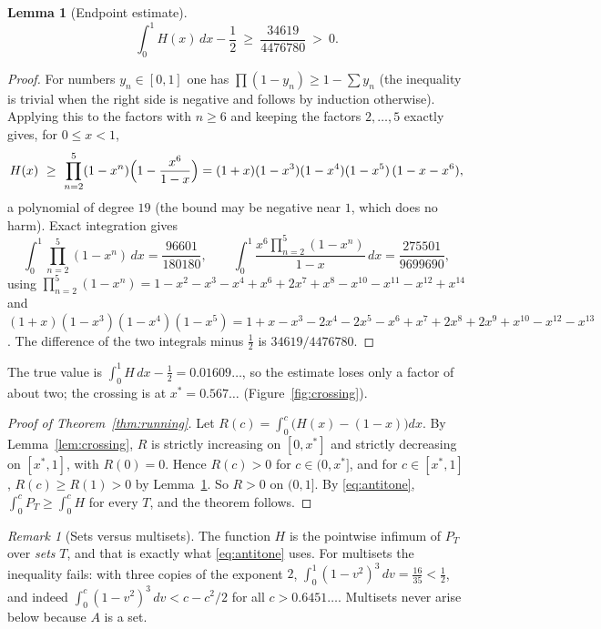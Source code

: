 \documentclass[11pt]{article}
\newtheorem{lemma}[theorem]{Lemma}
\theoremstyle{remark}
\newtheorem{remark}[theorem]{Remark}
\begin{document}
\begin{lemma}[Endpoint estimate]\label{lem:endpoint}
\[
  \int_0^1H(x)\,dx-\frac12\ \ge\ \frac{34619}{4476780}\ >\ 0 .
\]
\end{lemma}

\begin{proof}
For numbers $y_n\in[0,1]$ one has $\prod(1-y_n)\ge1-\sum y_n$ (the
inequality is trivial when the right side is negative and follows by
induction otherwise). Applying this to the factors with $n\ge6$ and
keeping the factors $2,\dots,5$ exactly gives, for $0\le x<1$,
\[
  H(x)\ \ge\ \prod_{n=2}^{5}(1-x^n)\Bigl(1-\frac{x^6}{1-x}\Bigr)
  =(1+x)(1-x^3)(1-x^4)(1-x^5)\,(1-x-x^6),
\]
a polynomial of degree $19$ (the bound may be negative near $1$, which
does no harm). Exact integration gives
\[
  \int_0^1\prod_{n=2}^{5}(1-x^n)\,dx=\frac{96601}{180180},
  \qquad
  \int_0^1\frac{x^6\prod_{n=2}^{5}(1-x^n)}{1-x}\,dx=\frac{275501}{9699690},
\]
using $\prod_{n=2}^{5}(1-x^n)
=1-x^2-x^3-x^4+x^6+2x^7+x^8-x^{10}-x^{11}-x^{12}+x^{14}$ and
$(1+x)(1-x^3)(1-x^4)(1-x^5)
=1+x-x^3-2x^4-2x^5-x^6+x^7+2x^8+2x^9+x^{10}-x^{12}-x^{13}$.
The difference of the two integrals minus $\tfrac12$ is
$34619/4476780$.
\end{proof}

The true value is $\int_0^1H\,dx-\tfrac12=0.01609\ldots$, so the
estimate loses only a factor of about two; the crossing is at
$x^*=0.567\ldots$ (Figure~\ref{fig:crossing}).

\begin{proof}[Proof of Theorem~\ref{thm:running}]
Let $R(c)=\int_0^c\bigl(H(x)-(1-x)\bigr)dx$. By
Lemma~\ref{lem:crossing}, $R$ is strictly increasing on $[0,x^*]$ and
strictly decreasing on $[x^*,1]$, with $R(0)=0$. Hence $R(c)>0$ for
$c\in(0,x^*]$, and for $c\in[x^*,1]$, $R(c)\ge R(1)>0$ by
Lemma~\ref{lem:endpoint}. So $R>0$ on $(0,1]$. By
\eqref{eq:antitone}, $\int_0^cP_T\ge\int_0^cH$ for every $T$, and the
theorem follows.
\end{proof}

\begin{remark}[Sets versus multisets]\label{rem:multiset}
The function $H$ is the pointwise infimum of $P_T$ over \emph{sets}
$T$, and that is exactly what \eqref{eq:antitone} uses. For multisets
the inequality fails: with three copies of the exponent $2$,
$\int_0^1(1-v^2)^3\,dv=\tfrac{16}{35}<\tfrac12$, and indeed
$\int_0^c(1-v^2)^3\,dv<c-c^2/2$ for all $c>0.6451\ldots$. Multisets
never arise below because $A$ is a set.
\end{remark}
\end{document}
